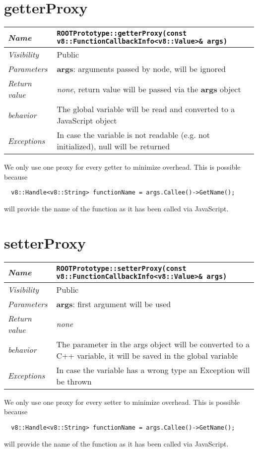 \section{getterProxy}
\begin{longtable}{p{3cm} @{\hskip 1cm} p{12cm}}
  \hline
  \textit{Name} & \texttt{ROOTPrototype::getterProxy(const v8::FunctionCallbackInfo<v8::Value>\& args)} \\
  \hline
  \textit{Visibility} & Public \\
  \hline
  \textit{Parameters} & \textbf{args}: arguments passed by node, will be ignored \\
  \hline
  \textit{Return value} & \textit{none}, return value will be passed via the \textbf{args} object \\
  \hline
  \textit{behavior} & The global variable will be read and converted to a JavaScript object\\
  \hline
  \textit{Exceptions} & In case the variable is not readable (e.g. not initialized), null will be returned
  \hline
\end{longtable}
We only use one proxy for every getter to minimize overhead. This is possible because
\begin{verbatim}
  v8::Handle<v8::String> functionName = args.Callee()->GetName();
\end{verbatim}
will provide the name of the function as it has been called via JavaScript.
\newpage
\section{setterProxy}
\begin{longtable}{p{3cm} @{\hskip 1cm} p{12cm}}
  \hline
  \textit{Name} & \texttt{ROOTPrototype::setterProxy(const v8::FunctionCallbackInfo<v8::Value>\& args)} \\
  \hline
  \textit{Visibility} & Public \\
  \hline
  \textit{Parameters} & \textbf{args}: first argument will be used \\
  \hline
  \textit{Return value} & \textit{none} \\
  \hline
  \textit{behavior} & The parameter in the args object will be converted to a C++ variable, it will be saved in the global variable\\
  \hline
  \textit{Exceptions} & In case the variable has a wrong type an Exception will be thrown
  \hline
\end{longtable}
We only use one proxy for every setter to minimize overhead. This is possible because
\begin{verbatim}
  v8::Handle<v8::String> functionName = args.Callee()->GetName();
\end{verbatim}
will provide the name of the function as it has been called via JavaScript.
\newpage
